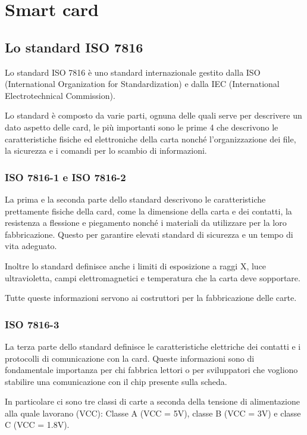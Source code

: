 \chapter{Smart card}
\label{chapter2}

\section{Lo standard ISO 7816}
\label{standard}

Lo standard ISO 7816 è uno standard internazionale gestito dalla ISO (International Organization for Standardization) e dalla IEC (International Electrotechnical Commission).

Lo standard è composto da varie parti, ognuna delle quali serve per descrivere un dato aspetto delle card, le più importanti sono le prime 4 che descrivono le caratteristiche fisiche ed elettroniche della carta nonché l'organizzazione dei file, la sicurezza e i comandi per lo scambio di informazioni.
\cite{wiki_iso}

\subsection{ISO 7816-1 e ISO 7816-2}
La prima e la seconda parte dello standard descrivono le caratteristiche prettamente fisiche della card, come la dimensione della carta e dei contatti, la resistenza a flessione e piegamento nonché i materiali da utilizzare per la loro fabbricazione. Questo per garantire elevati standard di sicurezza e un tempo di vita adeguato.

Inoltre lo standard definisce anche i limiti di esposizione a raggi X, luce ultravioletta, campi elettromagnetici e temperatura che la carta deve sopportare.

Tutte queste informazioni servono ai costruttori per la fabbricazione delle carte.
\cite{iso}

\subsection{ISO 7816-3}
La terza parte dello standard definisce le caratteristiche elettriche dei contatti e i protocolli di comunicazione con la card. Queste informazioni sono di fondamentale importanza per chi fabbrica lettori o per sviluppatori che vogliono stabilire una comunicazione con il chip presente sulla scheda.
\cite{iso}

In particolare ci sono tre classi di carte a seconda della tensione di alimentazione alla quale lavorano (VCC): Classe A (VCC = 5V), classe B (VCC = 3V) e classe C (VCC = 1.8V).

